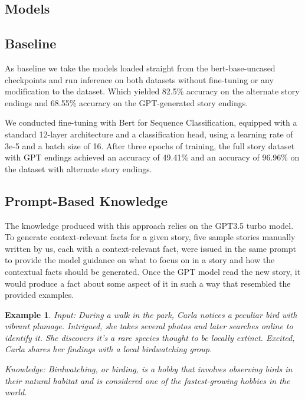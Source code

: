 \documentclass{article}
\begin{document}
\begin{multicols}{2}
\section{Models}

\subsection{Baseline}
As baseline we take the models loaded straight from the bert-base-uncased checkpoints and run inference on both datasets without fine-tuning or any modification to the dataset. Which yielded 82.5\% accuracy on the alternate story endings and 68.55\% accuracy on the GPT-generated story endings. 

We conducted fine-tuning with Bert for Sequence Classification, equipped with a standard 12-layer architecture and a classification head,  using a learning rate of 3e-5 and a batch size of 16. After three epochs of training, the full story dataset with GPT endings achieved an accuracy of 49.41\% and an accuracy of 96.96\% on the dataset with alternate story endings.

\subsection{Prompt-Based Knowledge}
The knowledge produced with this approach relies on the GPT3.5 turbo model. To generate context-relevant facts for a given story, five sample stories manually written by us, each with a context-relevant fact, were issued in the same prompt to provide the model guidance on what to focus on in a story and how the contextual facts should be generated. Once the GPT model read the new story, it would produce a fact about some aspect of it in such a way that resembled the provided examples. 

\newtheorem{example}{Example}


\begin{example}

Input: During a walk in the park, Carla notices a peculiar bird with vibrant plumage. Intrigued, she takes several photos and later searches online to identify it. She discovers it's a rare species thought to be locally extinct. Excited, Carla shares her findings with a local birdwatching group.


Knowledge: Birdwatching, or birding, is a hobby that involves observing birds in their natural habitat and is considered one of the fastest-growing hobbies in the world.
    
\end{example}


\end{multicols}
\end{document}

